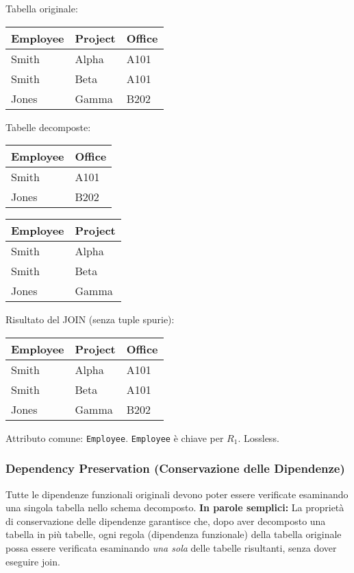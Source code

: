 	\noindent Tabella originale:
	\begin{center}
	\begin{tabular}{|l|l|l|}
		\hline
		\textbf{Employee} & \textbf{Project} & \textbf{Office} \\ \hline
		Smith & Alpha & A101 \\ \hline
		Smith & Beta & A101 \\ \hline
		Jones & Gamma & B202 \\ \hline
	\end{tabular}
	\end{center}

	\noindent Tabelle decomposte:
	\begin{center}
	\begin{tabular}{|l|l|}
		\hline
		\textbf{Employee} & \textbf{Office} \\ \hline
		Smith & A101 \\ \hline
		Jones & B202 \\ \hline
	\end{tabular}
	\quad
	\begin{tabular}{|l|l|}
		\hline
		\textbf{Employee} & \textbf{Project} \\ \hline
		Smith & Alpha \\ \hline
		Smith & Beta \\ \hline
		Jones & Gamma \\ \hline
	\end{tabular}
	\end{center}

	\noindent Risultato del JOIN (senza tuple spurie):
	\begin{center}
	\begin{tabular}{|l|l|l|}
		\hline
		\textbf{Employee} & \textbf{Project} & \textbf{Office} \\ \hline
		Smith & Alpha & A101 \\ \hline
		Smith & Beta & A101 \\ \hline
		Jones & Gamma & B202 \\ \hline
	\end{tabular}
	\end{center}
	
	\noindent Attributo comune: \texttt{Employee}. \texttt{Employee} è chiave per $R_1$. Lossless.
	
	\subsubsection{Dependency Preservation (Conservazione delle Dipendenze)}
	Tutte le dipendenze funzionali originali devono poter essere verificate esaminando una singola tabella nello schema decomposto.
	\newline
	\newline
	\textbf{In parole semplici:} La proprietà di conservazione delle dipendenze garantisce che, dopo aver decomposto una tabella in più tabelle, ogni regola (dipendenza funzionale) della tabella originale possa essere verificata esaminando \textit{una sola} delle tabelle risultanti, senza dover eseguire join.
	
